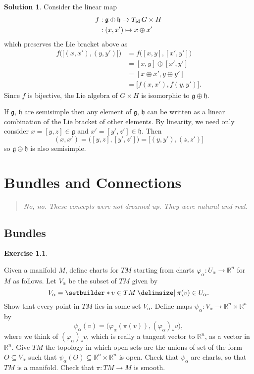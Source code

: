 \documentclass[11pt, a4paper]{report}
\theoremstyle{definition}
\newtheorem{exercise}{Exercise}[part]
\newtheorem{solution}{Solution}[part]
\newenvironment{ex}{\begin{exercise}}{\end{exercise}\pagebreak[1]}
\newenvironment{sol}{\begin{solution}}{\end{solution}\pagebreak[3]}
\newenvironment{epigraph}
    {\begin{quote}\small\itshape} %
    {\end{quote}\ignorespacesafterend\vspace{\parskip}}
\newcommand*{\op}[1]{\ensuremath\mathop{}\mathopen{}#1}
\newcommand*{\id}{\op{\mathrm{id}}}
\begin{document}
\begin{sol}
Consider the linear map
\begin{align*}
    f &: \mathfrak{g} \oplus \mathfrak{h} \to T_{\id}\, G \times H \\
      &: (x, x') \mapsto x \oplus x'
\end{align*}
which preserves the Lie bracket above as
\begin{align*}
    f \bigl( \bigl[(x, x'), (y, y') \bigr] \bigr)
        &= f \bigl( [x, y], [x'\!, y'] \bigr) \\
        &= [x, y] \oplus [x'\!, y'] \\
        &= [x \oplus x', y \oplus y'] \\
        &= \bigl[ f(x, x'), f(y, y') \bigr].
\end{align*}
Since $f$ is bijective, the Lie algebra of $G \times H$ is isomorphic to $\mathfrak{g} \oplus \mathfrak{h}$.

If $\mathfrak{g}$, $\mathfrak{h}$ are semisimple then any element of $\mathfrak{g}$, $\mathfrak{h}$ can be written as a linear combination of the Lie bracket of other elements.
By linearity, we need only consider $x = [y, z] \in \mathfrak{g}$ and $x' = [y', z'] \in \mathfrak{h}$.
Then
\[
    (x, x') = \bigl( [y, z], [y', z'] )
            = \bigl[ (y, y'), (z, z') \bigr]
\]
so $\mathfrak{g} \oplus \mathfrak{h}$ is also semisimple.

\end{sol}

\chapter{Bundles and Connections}

\begin{epigraph}
    No, no. These concepts were not dreamed up. They were natural and real.
\end{epigraph}

\section{Bundles}

\begin{ex}\label{ex:tangentbundlemanifold}

Given a manifold $M$, define charts for $TM$ starting from charts $\varphi_\alpha: U_\alpha \to \mathbb{R}^n$ for $M$ as follows.
Let $V_\alpha$ be the subset of $TM$ given by
\[
    V_\alpha = \setbuilder*{v \in TM \given \pi(v) \in U_\alpha}.
\]
Show that every point in $TM$ lies in some set $V_\alpha$.
Define maps $\psi_\alpha: V_\alpha \to \mathbb{R}^n \times \mathbb{R}^n$ by
\[
    \psi_\alpha(v) = \bigl( \varphi_\alpha (\pi(v)), {(\varphi_\alpha)}_* v\bigr),
\]
where we think of ${(\varphi_\alpha)}_* v$, which is really a tangent vector to $\mathbb{R}^n$, as a vector in $\mathbb{R}^n$.
Give $TM$ the topology in which open sets are the unions of set of the form $O \subseteq V_\alpha$ such that $\psi_\alpha(O) \subseteq \mathbb{R}^n \times \mathbb{R}^n$ is open.
Check that $\psi_\alpha$ are charts, so that $TM$ is a manifold.
Check that $\pi: TM \to M$ is smooth.

\end{ex}
\end{document}
